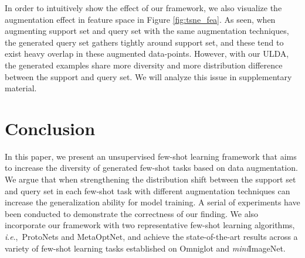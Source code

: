 \documentclass[letterpaper]{article} \usepackage{aaai21}  \usepackage{times}  \usepackage{helvet} \usepackage{courier}  \usepackage[hyphens]{url}  \usepackage{graphicx} \urlstyle{rm} \def\UrlFont{\rm}  \usepackage{natbib}  \usepackage{caption} \usepackage{url}
\newcommand{\ie}{\textit{i}.\textit{e}.,}
\begin{document}
In order to intuitively show the effect of our framework, we also visualize the augmentation effect in feature space in Figure \ref{fig:tsne_fea}. As seen, when augmenting support set and query set with the same augmentation techniques, the generated query set gathers tightly around support set, and these tend to exist heavy overlap in these augmented data-points. However, with our ULDA, the generated examples share more diversity and more distribution difference between the support and query set. We will analyze this issue in supplementary material.



\section{Conclusion}
In this paper, we present an unsupervised few-shot learning framework that aims to increase the diversity of generated few-shot tasks based on data augmentation. We argue that when strengthening the distribution shift between the support set and query set in each few-shot task with different augmentation techniques can increase the generalization ability for model training. A serial of experiments have been conducted to demonstrate the correctness of our finding. We also incorporate our framework with two representative few-shot learning algorithms, \ie~ProtoNets and MetaOptNet, and achieve the state-of-the-art results across a variety of few-shot learning tasks established on Omniglot and \emph{mini}ImageNet.




\appendix   \setcounter{table}{0}   \setcounter{figure}{0}
\renewcommand{\thetable}{A\arabic{table}}
\renewcommand{\thefigure}{A\arabic{figure}}
\end{document}
